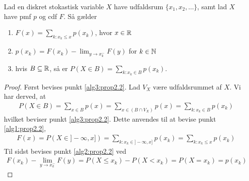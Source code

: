 \begin{prop}%
Lad en diskret stokastisk variable $X$ have udfaldsrum $\{x_1, x_2, \ldots\}$, samt lad $X$ have pmf $p$ og cdf $F$. Så gælder
\begin{enumerate}
    \item $F(x)=\displaystyle \sum_{k:x_k \leq x} p(x_k)$, hvor $x\in \mathbb{R}$ \label{alg1:prop2.2}
    \item $p(x_k)=F(x_k)- \displaystyle \lim_{y \rightarrow x_k^- } F(y)$ for $k\in \mathbb{N} $ \label{alg2:prop2.2}
    \item hvis $B \subseteq \mathbb{R}$, så er $P(X \in B)= \displaystyle \sum_{k:x_k \in B} p(x_k)$. \label{alg3:prop2.2}
\end{enumerate}
\end{prop} 
\begin{proof}
Først bevises punkt \ref{alg3:prop2.2}. Lad $V_X$ være udfaldsrummet af $X$. Vi har derved, at
\begin{align*}
    P(X\in B)=\sum_{x\in B}p(x)=\sum_{x\in(B\cap V_X)}p(x)=\sum_{k:x_k\in B}p(x_k)
\end{align*}
hvilket beviser punkt \ref{alg3:prop2.2}. Dette anvendes til at bevise punkt \ref{alg1:prop2.2},
\begin{align*}
    F(x)=P(X\in]-\infty,x])=\sum_{k:x_k\in ]-\infty,x]}p(x_k)=\sum_{k:x_k\leq x}p(x_k)
\end{align*}
Til sidst bevises punkt \ref{alg2:prop2.2} ved
\begin{align*}
    F(x_k)-\lim_{y\rightarrow x_k^-}F(y)=P(X\leq x_k)-P(X<x_k)=P(X=x_k)=p(x_k)
\end{align*}
\end{proof}

